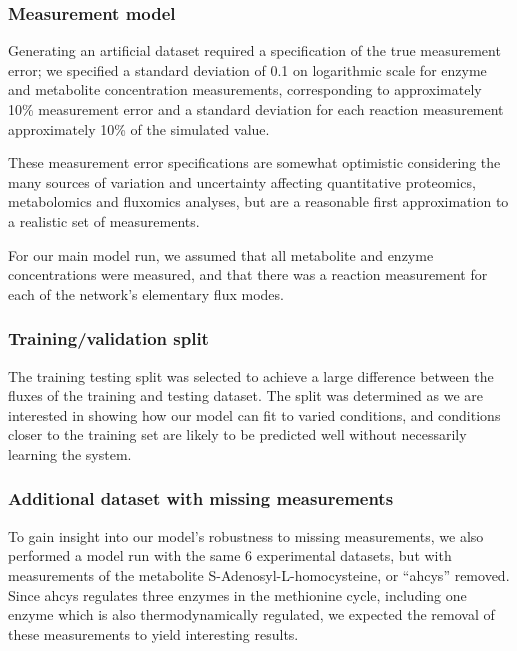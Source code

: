\documentclass[
  letterpaper,
  DIV=11,
  numbers=noendperiod]{scrartcl}
\begin{document}
\hypertarget{measurement-model}{%
\subsubsection{Measurement model}\label{measurement-model}}

Generating an artificial dataset required a specification of the true
measurement error; we specified a standard deviation of 0.1 on
logarithmic scale for enzyme and metabolite concentration measurements,
corresponding to approximately 10\% measurement error and a standard
deviation for each reaction measurement approximately 10\% of the
simulated value.

These measurement error specifications are somewhat optimistic
considering the many sources of variation and uncertainty affecting
quantitative proteomics, metabolomics and fluxomics analyses, but are a
reasonable first approximation to a realistic set of measurements.

For our main model run, we assumed that all metabolite and enzyme
concentrations were measured, and that there was a reaction measurement
for each of the network's elementary flux modes.

\hypertarget{trainingvalidation-split}{%
\subsubsection{Training/validation
split}\label{trainingvalidation-split}}

The training testing split was selected to achieve a large difference
between the fluxes of the training and testing dataset. The split was
determined as we are interested in showing how our model can fit to
varied conditions, and conditions closer to the training set are likely
to be predicted well without necessarily learning the system.

\hypertarget{additional-dataset-with-missing-measurements}{%
\subsubsection{Additional dataset with missing
measurements}\label{additional-dataset-with-missing-measurements}}

To gain insight into our model's robustness to missing measurements, we
also performed a model run with the same 6 experimental datasets, but
with measurements of the metabolite S-Adenosyl-L-homocysteine, or
``ahcys'' removed. Since ahcys regulates three enzymes in the methionine
cycle, including one enzyme which is also thermodynamically regulated,
we expected the removal of these measurements to yield interesting
results.
\end{document}
